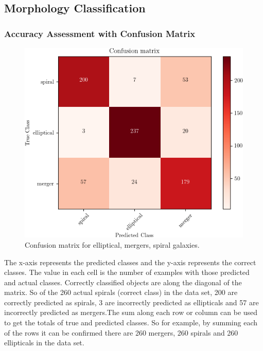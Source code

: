 \subsection{Morphology Classification}

\subsubsection{Accuracy Assessment with Confusion Matrix} \label{mc1}
\begin{figure}[H]
	\centering
	\includegraphics[width=\linewidth,keepaspectratio]{images/misc/confusion_matrix.png}
	\caption{Confusion matrix for elliptical, mergers, spiral galaxies.}
	\label{fig:cfm}
\end{figure}

The x-axis represents the predicted classes and the y-axis represents the correct classes. The value in each cell is the number of examples with those predicted and actual classes. Correctly classified objects are along the diagonal of the matrix. So of the 260 actual spirals (correct class) in the data set, 200 are correctly predicted as spirals, 3 are incorrectly predicted as ellipticals and 57 are incorrectly predicted as mergers.The sum along each row or column can be used to get the totals of true and predicted classes. So for example, by summing each of the rows it can be confirmed there are 260 mergers, 260 spirals and 260 ellipticals in the data set.

